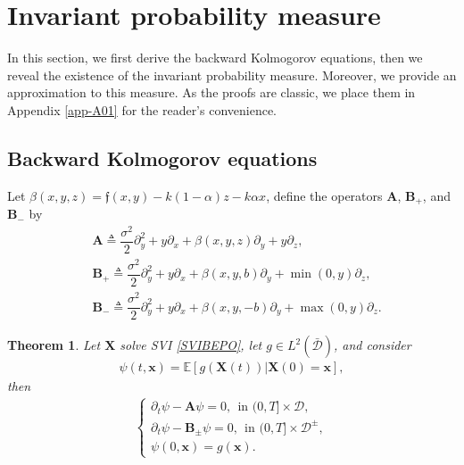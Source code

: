 \documentclass[12pt]{article}
\numberwithin{equation}{section}
\newtheorem{theorem}{Theorem}[section]
\def \E{\mathbb E}
\def \AA {\mathbf A}
\def \BB {\mathbf B}
\newcommand{\D}{\mathcal{D}}
\begin{document}
\section{Invariant probability measure\label{sec:invariantmeasure}}
In this section, 
we first derive the backward Kolmogorov equations, 
then we reveal the existence of the invariant probability measure. 
Moreover, we provide an approximation to this measure. 
As the proofs are classic, we place them in Appendix \ref{app-A01} for the reader's convenience. 


\subsection{Backward Kolmogorov equations}
Let $\beta(x,y,z) = \mathfrak{f} (x, y) - k(1-\alpha) z -k\alpha x$, 
define the operators $\AA$, $\BB_{+}$, and $\BB_{-}$ by
\begin{align*}
	&\AA  \triangleq \dfrac{\sigma^{2}}{2}\partial^{2}_{y}
	+ y \partial_{x}
	+ \beta(x,y,z)\partial_{y}
	+ y\partial_{z},\\
	&\BB_{+} \triangleq \dfrac{\sigma^{2}}{2}\partial^{2}_{y}
	+ y \partial_{x}
	+ \beta(x,y,b)\partial_{y} + \min(0,y)\partial_{z},\\
	&\BB_{-}  \triangleq \dfrac{\sigma^{2}}{2}\partial^{2}_{y}
	+ y \partial_{x}
	+ \beta(x,y,-b)\partial_{y}+ \max(0,y)\partial_{z}. 
\end{align*}

\begin{theorem}\label{Prop01_BEPO}
	Let $\mathbf{X}$ solve SVI \eqref{SVIBEPO}, 
	let $g\in L^{2}(\bar{\D})$, and consider
	\begin{align}\label{SVI-sol01}
		\psi(t, \mathbf{x}) = \E[g(\mathbf{X}(t)) | \mathbf{X}(0) = \mathbf{x}], 
	\end{align}
	then
	\begin{align}
		\begin{cases}\label{SVI-eq01}
			\partial_{t}\psi - \AA \psi = 0,~~\text{in~}(0,T]\times \D,\\
			\partial_{t}\psi - \BB_{\pm} \psi = 0,~~\text{in~}(0,T]\times \D^{\pm},\\
			\psi(0,\mathbf{x}) = g(\mathbf{x}). 
		\end{cases}
	\end{align}
	
\end{theorem}
\end{document}
